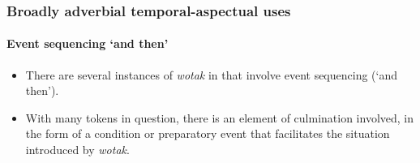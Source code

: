 \subsubsection{Broadly adverbial temporal-aspectual uses}
\paragraph{Event sequencing \lq{}and then\rq}
\label{appendixBukiyipSequencing}
\begin{itemize}
	\item There are several instances of \textit{wotak} in \textcite[167]{ConradWigoga1991} that involve event sequencing (\lq and then').
	\item With many tokens in question, there is an element of culmination involved, in the form of a condition or preparatory event that facilitates the situation introduced by \textit{wotak}. 
\end{itemize}

